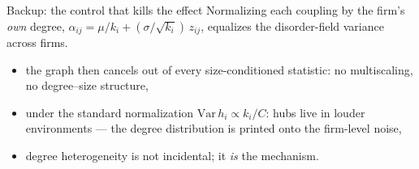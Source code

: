 \documentclass[aspectratio=169,10pt]{beamer}
\begin{document}
\begin{frame}{Backup: the control that kills the effect}
  Normalizing each coupling by the firm's \emph{own} degree,
  $\alpha_{ij} = \mu/k_i + (\sigma/\sqrt{k_i})\,z_{ij}$, equalizes the disorder-field
  variance across firms.
  \begin{itemize}
    \item the graph then cancels out of every size-conditioned statistic:
      no multiscaling, no degree--size structure,
    \item under the standard normalization $\mathrm{Var}\,h_i \propto k_i/C$:
      hubs live in louder environments --- the degree distribution is printed onto
      the firm-level noise,
    \item degree heterogeneity is not incidental; it \emph{is} the mechanism.
  \end{itemize}
\end{frame}
\end{document}
